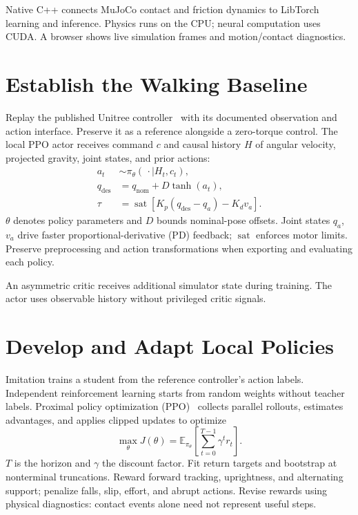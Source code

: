 Native C++ connects MuJoCo contact and friction dynamics to LibTorch learning
and inference. Physics runs on the CPU; neural computation uses CUDA. A browser
shows live simulation frames and motion/contact diagnostics.

\section{Establish the Walking Baseline}
Replay the published Unitree controller~\cite{unitreeGym} with its documented
observation and action interface. Preserve it as a reference alongside a
zero-torque control. The local PPO actor receives command $c$ and causal history
$H$ of angular velocity, projected gravity, joint states, and prior actions:
\begin{equation}
\begin{aligned}
a_t&\sim\pi_\theta(\,\cdot\mid H_t,c_t),\\
q_{\mathrm{des}}&=q_{\mathrm{nom}}+D\tanh(a_t),\\
\tau&=\operatorname{sat}[K_p(q_{\mathrm{des}}-q_a)-K_dv_a].
\end{aligned}
\end{equation}
$\theta$ denotes policy parameters and $D$ bounds nominal-pose offsets.
Joint states $q_a$, $v_a$ drive faster proportional-derivative (PD) feedback;
$\operatorname{sat}$ enforces motor limits. Preserve preprocessing and action
transformations when exporting and evaluating each policy.

An asymmetric critic receives additional simulator state during training.
The actor uses observable history without privileged critic signals.

\section{Develop and Adapt Local Policies}
Imitation trains a student from the reference controller's action labels.
Independent reinforcement learning starts from random weights without teacher
labels. Proximal policy optimization (PPO)~\cite{schulman2017} collects parallel
rollouts, estimates advantages, and applies clipped updates to optimize
\begin{equation}
\max_\theta J(\theta)=\mathbb E_{\pi_\theta}
\left[\sum_{t=0}^{T-1}\gamma^t r_t\right].
\end{equation}
$T$ is the horizon and $\gamma$ the discount factor. Fit return targets and
bootstrap at nonterminal truncations. Reward forward tracking, uprightness,
and alternating support; penalize falls, slip, effort, and abrupt actions.
Revise rewards using physical diagnostics: contact events alone need not
represent useful steps.

